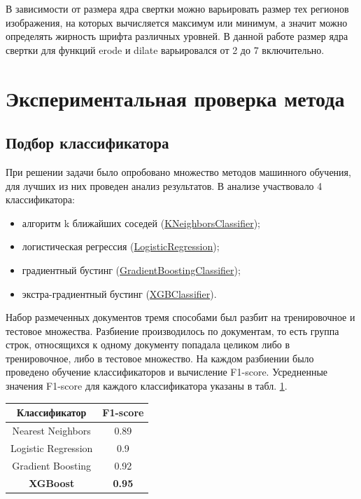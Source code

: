 \documentclass{ProcISPRAS}
\begin{document}
В зависимости от размера ядра свертки можно варьировать размер тех регионов изображения, на которых вычисляется максимум или минимум, а значит можно определять жирность шрифта различных уровней. В данной работе размер ядра свертки для функций erode и dilate варьировался от 2 до 7 включительно.

\section{Экспериментальная проверка метода}

\subsection{Подбор классификатора}

При решении задачи было опробовано множество методов машинного обучения, для лучших из них проведен анализ результатов. В анализе участвовало 4 классификатора:

\begin{itemize}

  \item алгоритм k ближайших соседей (\href{https://scikit-learn.org/stable/modules/generated/sklearn.neighbors.KNeighborsClassifier.html}{KNeighborsClassifier});
  \item логистическая регрессия (\href{https://scikit-learn.org/stable/modules/generated/sklearn.linear_model.LogisticRegression.html}{LogisticRegression});
  \item градиентный бустинг (\href{https://scikit-learn.org/stable/modules/generated/sklearn.ensemble.GradientBoostingClassifier.html}{GradientBoostingClassifier});
  \item экстра-градиентный бустинг (\href{https://xgboost.readthedocs.io/en/latest/}{XGBClassifier}).

\end{itemize}

Набор размеченных документов тремя способами был разбит на тренировочное и тестовое множества. Разбиение производилось по документам, то есть группа строк, относящихся к одному документу попадала целиком либо в тренировочное, либо в тестовое множество. На каждом разбиении было проведено обучение классификаторов и вычисление F1-score. Усредненные значения F1-score для каждого классификатора указаны в табл. \ref{tab:classifier_comparison}.
\begin{table}[ht]
\begin{tabular}{cc}
 \toprule
    \textbf{Классификатор} & \textbf{F1-score} \\
    \midrule
        Nearest Neighbors & 0.89 \\
        Logistic Regression & 0.9 \\
        Gradient Boosting & 0.92 \\
        \bf XGBoost & \bf 0.95 \\
    \bottomrule
    \end{tabular}
    \label{tab:classifier_comparison}
\end{table}
\end{document}

